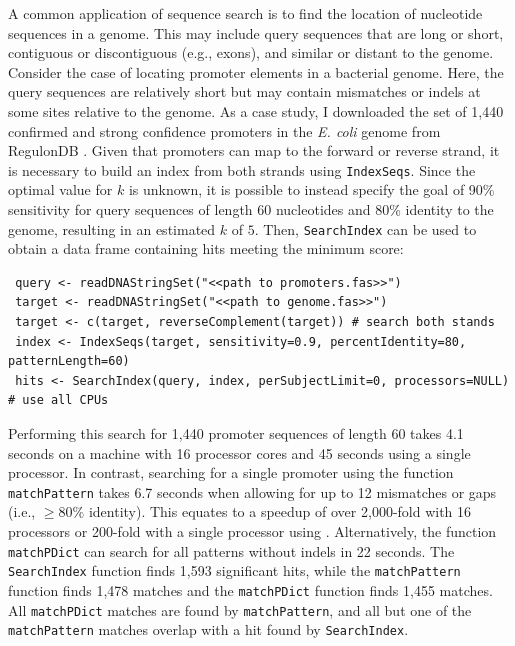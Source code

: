 A common application of sequence search is to find the location of nucleotide sequences in a genome. This may include query sequences that are long or short, contiguous or discontiguous (e.g., exons), and similar or distant to the genome. Consider the case of locating promoter elements in a bacterial genome. Here, the query sequences are relatively short but may contain mismatches or indels at some sites relative to the genome. As a case study, I downloaded the set of 1,440 confirmed and strong confidence promoters in the \textit{E. coli} genome from RegulonDB \citep{RN4283}. Given that promoters can map to the forward or reverse strand, it is necessary to build an index from both strands using \texttt{IndexSeqs}. Since the optimal value for \(k\) is unknown, it is possible to instead specify the goal of 90\% sensitivity for query sequences of length 60 nucleotides and 80\% identity to the genome, resulting in an estimated \(k\) of \(5\). Then, \texttt{SearchIndex} can be used to obtain a data frame containing hits meeting the minimum score:

\begin{verbatim}
 query <- readDNAStringSet("<<path to promoters.fas>>")
 target <- readDNAStringSet("<<path to genome.fas>>")
 target <- c(target, reverseComplement(target)) # search both stands
 index <- IndexSeqs(target, sensitivity=0.9, percentIdentity=80, patternLength=60)
 hits <- SearchIndex(query, index, perSubjectLimit=0, processors=NULL) # use all CPUs
\end{verbatim}

Performing this search for 1,440 promoter sequences of length 60 takes 4.1 seconds on a machine with 16 processor cores and 45 seconds using a single processor. In contrast, searching for a single promoter using the  function \texttt{matchPattern} takes 6.7 seconds when allowing for up to 12 mismatches or gaps (i.e., \(\ge 80\%\) identity). This equates to a speedup of over 2,000-fold with 16 processors or 200-fold with a single processor using . Alternatively, the  function \texttt{matchPDict} can search for all patterns without indels in 22 seconds. The \texttt{SearchIndex} function finds 1,593 significant hits, while the \texttt{matchPattern} function finds 1,478 matches and the \texttt{matchPDict} function finds 1,455 matches. All \texttt{matchPDict} matches are found by \texttt{matchPattern}, and all but one of the \texttt{matchPattern} matches overlap with a hit found by \texttt{SearchIndex}.

